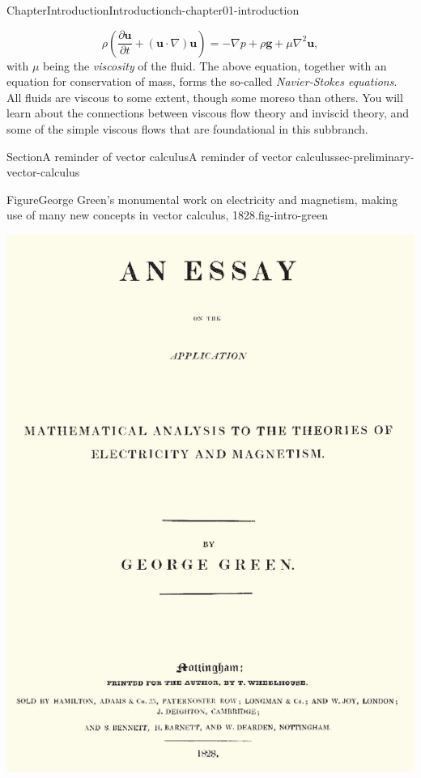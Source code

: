 \documentclass[oneside,10pt,]{book}
\numberwithin{equation}{section}
\newcommand{\pd}[2]{\frac{\partial#1}{\partial#2}}
\newcommand{\bu}{\boldsymbol{u}}
\newcommand{\bg}{\boldsymbol{g}}
\begin{document}
\begin{chapterptx}{Chapter}{Introduction}{}{Introduction}{}{}{ch-chapter01-introduction}
\begin{introduction}{}
\begin{equation*}
\rho\left(\pd{\bu}{t} + (\bu \cdot \nabla)\bu\right) = -\nabla p + \rho \bg + \mu \nabla^2 \bu,
\end{equation*}
with \(\mu\) being the \emph{viscosity} of the fluid. The above equation, together with an equation for conservation of mass, forms the so-called \emph{Navier-Stokes equations}. All fluids are viscous to some extent, though some moreso than others. You will learn about the connections between viscous flow theory and inviscid theory, and some of the simple viscous flows that are foundational in this subbranch.%
\end{introduction}%
%
%
\typeout{************************************************}
\typeout{************************************************}
%
\begin{sectionptx}{Section}{A reminder of vector calculus}{}{A reminder of vector calculus}{}{}{sec-preliminary-vector-calculus}
\begin{figureptx}{Figure}{George Green's monumental work on electricity and magnetism, making use of many new concepts in vector calculus, 1828.}{fig-intro-green}{}%
\begin{image}{0.25}{0.5}{0.25}{}%
\includegraphics[width=\linewidth]{external/GreenEssay.png}

\end{image}
\end{figureptx}
\end{sectionptx}
\end{chapterptx}
\end{document}

